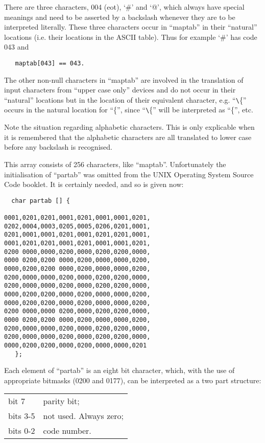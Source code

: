There are three characters, 004 (eot),
`\#' and `@', which always have special
meanings and need to be asserted by a
backslash whenever they are to be
interpreted literally. These three
characters occur in ``maptab'' in their
``natural'' locations (i.e. their locations in the ASCII table). Thus for
example `\#' has code 043 and

\begin{verbatim}
   maptab[043] == 043.
\end{verbatim}

The other non-null characters in ``maptab'' are involved in the translation of
input characters from ``upper case only''
devices and do not occur in their
``natural'' locations but in the location
of their equivalent character, e.g. ``\verb+\+\{''
occurs in the natural location for ``\{'',
since ``\verb+\+\{'' will be interpreted as ``\{'',
etc.

Note the situation regarding alphabetic
characters. This is only explicable
when it is remembered that the alphabetic characters are all translated to
lower case before any backslash is
recognised.


This array consists of 256 characters,
like ``maptab''. Unfortunately the initialisation of ``partab''
was omitted from the UNIX Operating System Source Code
booklet. It is certainly needed, and so
is given now:

\begin{verbatim}
  char partab [] {

0001,0201,0201,0001,0201,0001,0001,0201,
0202,0004,0003,0205,0005,0206,0201,0001,
0201,0001,0001,0201,0001,0201,0201,0001,
0001,0201,0201,0001,0201,0001,0001,0201,
0200 0000,0000,0200,0000,0200,0200,0000,
0000 0200,0200 0000,0200,0000,0000,0200,
0000,0200,0200 0000,0200,0000,0000,0200,
0200,0000,0000,0200,0000,0200,0200,0000,
0200,0000,0000,0200,0000,0200,0200,0000,
0000,0200,0200,0000,0200,0000,0000,0200,
0000,0200,0200,0000,0200,0000,0000,0200,
0200 0000,0000 0200,0000,0200,0200,0000,
0000 0200,0200 0000,0200,0000,0000,0200,
0200,0000,0000,0200,0000,0200,0200,0000,
0200,0000,0000,0200,0000,0200,0200,0000,
0000,0200,0200,0000,0200,0000,0000,0201
   };
\end{verbatim}

Each element of ``partab'' is an eight
bit character, which, with the use of
appropriate bitmasks (0200 and 0177),
can be interpreted as a two part structure:

\begin{tabular}{ll}\\
bit 7    & parity bit;\\
bits 3-5 & not used. Always zero;\\
bits 0-2 & code number.\\
\end{tabular}

